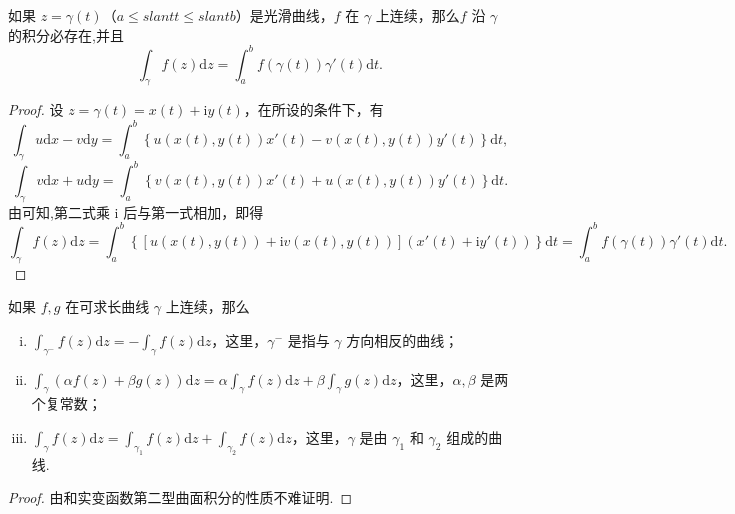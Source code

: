 \documentclass[../../main.tex]{subfiles}
\begin{document}
\begin{proposition}\label{proposition:复变函数积分参数方程形式}
如果 \( z = \gamma(t) \)（\( a \leqslant slant t \leqslant slant b \)）是光滑曲线，\( f \) 在 \( \gamma \) 上连续，那么\( f \) 沿 \( \gamma \) 的积分必存在,并且
\[
\int_\gamma f(z)\mathrm{d}z = \int_a^b f(\gamma(t))\gamma'(t)\mathrm{d}t.
\]
\end{proposition}
\begin{proof}
设 \( z = \gamma(t) = x(t) + \mathrm{i}y(t) \)，在所设的条件下，有
\[
\int_\gamma u \mathrm{d}x - v \mathrm{d}y
= \int_a^b \left\{ u(x(t), y(t))x'(t) - v(x(t), y(t))y'(t) \right\} \mathrm{d}t,
\]
\[
\int_\gamma v \mathrm{d}x + u \mathrm{d}y
= \int_a^b \left\{ v(x(t), y(t))x'(t) + u(x(t), y(t))y'(t) \right\} \mathrm{d}t.
\]
由可知,第二式乘 \( \mathrm{i} \) 后与第一式相加，即得
\[
\int_\gamma f(z)\mathrm{d}z
= \int_a^b \left\{ [u(x(t), y(t)) + \mathrm{i}v(x(t), y(t))](x'(t) + \mathrm{i}y'(t)) \right\} \mathrm{d}t
= \int_a^b f(\gamma(t))\gamma'(t)\mathrm{d}t.
\]
\end{proof}

\begin{proposition}
如果 \( f, g \) 在可求长曲线 \( \gamma \) 上连续，那么
\begin{enumerate}[(i)]
\item \( \int_{\gamma^-} f(z)\mathrm{d}z = -\int_\gamma f(z)\mathrm{d}z \)，这里，\( \gamma^- \) 是指与 \( \gamma \) 方向相反的曲线；

\item \( \int_\gamma (\alpha f(z) + \beta g(z))\mathrm{d}z = \alpha \int_\gamma f(z)\mathrm{d}z + \beta \int_\gamma g(z)\mathrm{d}z \)，这里，\( \alpha, \beta \) 是两个复常数；

\item \( \int_\gamma f(z)\mathrm{d}z = \int_{\gamma_1} f(z)\mathrm{d}z + \int_{\gamma_2} f(z)\mathrm{d}z \)，这里，\( \gamma \) 是由 \( \gamma_1 \) 和 \( \gamma_2 \) 组成的曲线.
\end{enumerate}
\end{proposition}
\begin{proof}
由和实变函数第二型曲面积分的性质不难证明.
\end{proof}
\end{document}
